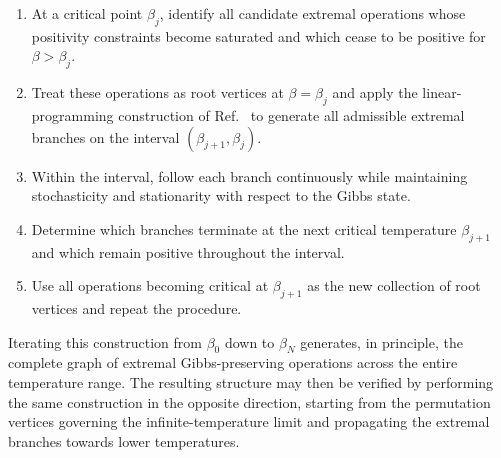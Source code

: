 \documentclass[11pt,a4paper,longbibliography]{amsart}
\numberwithin{equation}{section}
\theoremstyle{plain}
\theoremstyle{definition}
\theoremstyle{remark}
\begin{document}
			\begin{enumerate} 
				\item At a critical point $\beta_j$, identify all candidate extremal operations whose positivity constraints become saturated and which cease to be positive for $\beta>\beta_j$. 
				
				\item Treat these operations as root vertices at $\beta=\beta_j$ and apply the linear-programming construction of Ref.~\cite{mazurek2018decomposability} to generate all admissible extremal branches on the interval $(\beta_{j+1},\beta_j)$. 
				
				\item Within the interval, follow each branch continuously while maintaining stochasticity and stationarity with respect to the Gibbs state. 
				
				\item Determine which branches terminate at the next critical temperature $\beta_{j+1}$ and which remain positive throughout the interval. 
				
				\item Use all operations becoming critical at $\beta_{j+1}$ as the new collection of root vertices and repeat the procedure. 
			\end{enumerate} 
			Iterating this construction from $\beta_0$ down to $\beta_N$ generates, in principle, the complete graph of extremal Gibbs-preserving operations across the entire temperature range. The resulting structure may then be verified by performing the same construction in the opposite direction, starting from the permutation vertices governing the infinite-temperature limit and propagating the extremal branches towards lower temperatures.
			
\end{document}
